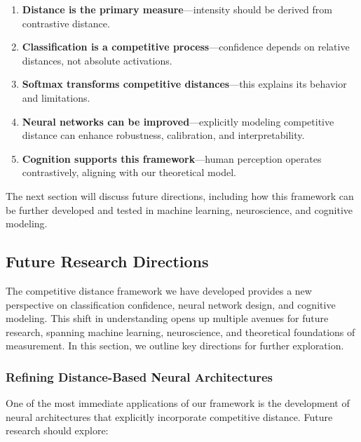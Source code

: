 \documentclass[12pt]{article}
\begin{document}
\begin{enumerate}
    \item \textbf{Distance is the primary measure}—intensity should be derived from contrastive distance.
    \item \textbf{Classification is a competitive process}—confidence depends on relative distances, not absolute activations.
    \item \textbf{Softmax transforms competitive distances}—this explains its behavior and limitations.
    \item \textbf{Neural networks can be improved}—explicitly modeling competitive distance can enhance robustness, calibration, and interpretability.
    \item \textbf{Cognition supports this framework}—human perception operates contrastively, aligning with our theoretical model.
\end{enumerate}

The next section will discuss future directions, including how this framework can be further developed and tested in machine learning, neuroscience, and cognitive modeling.

\subsection{Future Research Directions}

The competitive distance framework we have developed provides a new perspective on classification confidence, neural network design, and cognitive modeling. This shift in understanding opens up multiple avenues for future research, spanning machine learning, neuroscience, and theoretical foundations of measurement. In this section, we outline key directions for further exploration.

\subsubsection{Refining Distance-Based Neural Architectures}

One of the most immediate applications of our framework is the development of neural architectures that explicitly incorporate competitive distance. Future research should explore:
\end{document}
